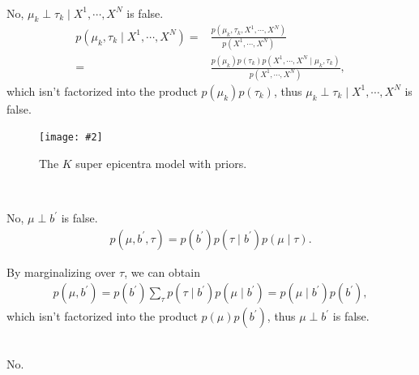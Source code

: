 \documentclass[11pt]{extarticle}
\newcommand{\0}{\mathbf{0}}
\renewcommand{\(}{\left(}
\renewcommand{\)}{\right)}
\theoremstyle{definition}
\newcommand{\image}[3]{
	\begin{figure}[!ht]
		\centering
	    \texttt{[image: \#2]}
		\caption{#3}
		\label{fig:#2}
	\end{figure}
}
\begin{document}
\noindent{} \\
\par No, $\mu_{k} \perp \tau_{k} \mid X^{1}, \cdots, X^{N}$ is false.
\begin{align*}
    p(\mu_{k}, \tau_{k} \mid X^{1}, \cdots, X^{N}) =& \frac{p\left(\mu_{k}, \tau_{k}, X^{1}, \cdots, X^{N} \right)}{p\left(X^{1}, \cdots , X^{N} \right)} \\
    =& \frac{p(\mu_{k})p(\tau_{k})p\left(X^{1},\cdots,X^{N} \mid \mu_{k}, \tau_{k}\right)}{p\left(X^{1}, \cdots, X^{N}\right)},
\end{align*}
which isn't factorized into the product $p(\mu_{k})p(\tau_{k})$, thus $\mu_{k} \perp \tau_{k} \mid X^{1}, \cdots, X^{N}$ is false.

\image{0.5}{Q2_2_6}{The $K$ super epicentra model with priors.}
\noindent{} \\
\par No, $\mu \perp b^{'}$ is false.
\begin{align*}
    p(\mu, b^{'}, \tau) = p(b^{'}) p(\tau \mid b^{'}) p(\mu \mid \tau).
\end{align*}
\par By marginalizing over $\tau$, we can obtain
\begin{align*}
    p(\mu, b^{'}) = p(b^{'}) \sum_{\tau} p(\tau \mid b^{'}) p(\mu \mid b^{'}) = p(\mu \mid b^{'}) p(b^{'}),
\end{align*}
which isn't factorized into the product $p(\mu)p(b^{'})$, thus $\mu \perp b^{'}$ is false. \\

\noindent{} \\
\par No. \\
\end{document}
